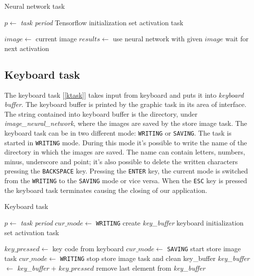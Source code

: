 \documentclass[12pt]{article}
\begin{document}
\begin{algorithm}[H]
\caption{Neural network task}
\label{nntask}

\begin{algorithmic}
\State $p\gets$ \textit{task period}
\State Tensorflow initialization
\State set activation task

\Loop
\State $image\gets$ current image
\State $results\gets$ use neural network with given $image$
\State wait for next activation
\EndLoop

\end{algorithmic}
\end{algorithm}

\subsection{Keyboard task}
The keyboard task [\ref{ktask}] takes input from keyboard and puts it into
\textit{keyboard buffer}. The keyboard buffer is printed by the graphic task
in its area of interface. The string contained into keyboard buffer is the
directory, under \textit{image\_neural\_network}, where the images are saved
by the store image task. The keyboard task can be in two different mode:
\texttt{WRITING} or \texttt{SAVING}. The task is started in \texttt{WRITING}
mode. During this mode it's possible to write the name of the directory in
which the images are saved. The name can contain letters, numbers, minus,
underscore and point; it's also possible to delete the written characters
pressing the \texttt{BACKSPACE} key. Pressing the \texttt{ENTER} key, the
current mode is switched from the \texttt{WRITING} to the \texttt{SAVING}
mode or vice versa. When the \texttt{ESC} key is pressed the keyboard task
terminates causing the closing of our application.

\begin{algorithm}[H]
\caption{Keyboard task}
\label{ktask}

\begin{algorithmic}
\State $p\gets$ \textit{task period}
\State $cur\_mode\gets$ \texttt{WRITING}
\State create \textit{key\_buffer}
\State keyboard initialization
\State set activation task

\Repeat
\State $key\_pressed\gets$ key code from keyboard
    \State $cur\_mode\gets$ \texttt{SAVING}
    \State start store image task
    \Else
    \State $cur\_mode\gets$ \texttt{WRITING}
    \State stop store image task and clean key\_buffer
    \EndIf
{}
        \State \textit{key\_buffer} $\gets$ \textit{key\_buffer} + $key\_pressed$ 
        \State remove last element from \textit{key\_buffer}
    \EndIf
\EndIf


\end{algorithmic}
\end{algorithm}
\end{document}
